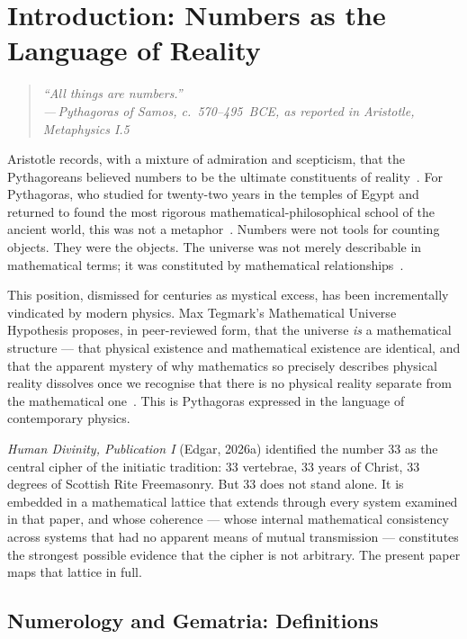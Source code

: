 \documentclass[12pt, a4paper]{article}
\newcommand{\epigraph}[2]{%
  \begin{quote}
    \itshape ``#1''\\[0.3em]
    \normalfont\small\hfill ---\,#2
  \end{quote}
}
\begin{document}
\newpage
\tableofcontents
\newpage

\section{Introduction: Numbers as the Language of Reality}

\epigraph{All things are numbers.}{Pythagoras of Samos, c.~570--495~BCE,
as reported in Aristotle, \emph{Metaphysics} I.5}

Aristotle records, with a mixture of admiration and scepticism, that the
Pythagoreans believed numbers to be the ultimate constituents of
reality~\autocite{aristotle_metaphysics}. For Pythagoras, who studied for
twenty-two years in the temples of Egypt and returned to found the most
rigorous mathematical-philosophical school of the ancient world, this was not
a metaphor~\autocite{iamblichus1818}. Numbers were not tools for counting
objects. They were the objects. The universe was not merely describable in
mathematical terms; it was constituted by mathematical
relationships~\autocite{pythagoras1926}.

This position, dismissed for centuries as mystical excess, has been
incrementally vindicated by modern physics. Max Tegmark's Mathematical
Universe Hypothesis proposes, in peer-reviewed form, that the universe
\emph{is} a mathematical structure — that physical existence and mathematical
existence are identical, and that the apparent mystery of why mathematics so
precisely describes physical reality dissolves once we recognise that there is
no physical reality separate from the mathematical one~\autocite[13]{livio2002}.
This is Pythagoras expressed in the language of contemporary physics.

\emph{Human Divinity, Publication I} (Edgar, 2026a) identified the number 33 as the
central cipher of the initiatic tradition: 33 vertebrae, 33 years of Christ,
33 degrees of Scottish Rite Freemasonry. But 33 does not stand alone. It is
embedded in a mathematical lattice that extends through every system examined
in that paper, and whose coherence — whose internal mathematical consistency
across systems that had no apparent means of mutual transmission — constitutes
the strongest possible evidence that the cipher is not arbitrary. The present
paper maps that lattice in full.

\subsection{Numerology and Gematria: Definitions}
\end{document}
